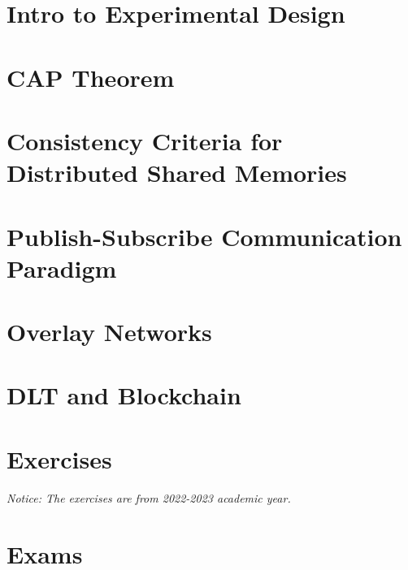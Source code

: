 	\newpage
	\section{Intro to Experimental Design}
	
	\newpage
	\section{CAP Theorem}
	
	\newpage
	\section{Consistency Criteria for Distributed Shared Memories}
	
	\newpage
	\section{Publish-Subscribe Communication Paradigm}
	
	\newpage
	\section{Overlay Networks}
	
	\newpage
	\section{DLT and Blockchain}
		
	\newpage
	\section{Exercises}
	\emph{Notice: The exercises are from 2022-2023 academic year.}
	
	\newpage
	\section{Exams}

	
